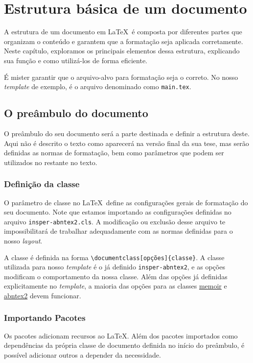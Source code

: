 \chapter{Estrutura básica de um documento}

A estrutura de um documento em \LaTeX\ é composta por diferentes partes que organizam o conteúdo e garantem que a formatação seja aplicada corretamente. Neste capítulo, exploramos os principais elementos dessa estrutura, explicando sua função e como utilizá-los de forma eficiente.

É mister garantir que o arquivo-alvo para formatação seja o correto. No nosso \textit{template} de exemplo, é o arquivo denominado como \texttt{main.tex}.

\section{O preâmbulo do documento}
O preâmbulo do seu documento será a parte destinada e definir a estrutura deste. Aqui não é descrito o texto como aparecerá na versão final da sua tese, mas serão definidas as normas de formatação, bem como parâmetros que podem ser utilizados no restante no texto.

\subsection{Definição da classe}
O parâmetro de classe no \LaTeX\ define as configurações gerais de formatação do seu documento. Note que estamos importando as configurações definidas no arquivo \texttt{insper-abntex2.cls}. A modificação ou exclusão desse arquivo te impossibilitará de trabalhar adequadamente com as normas definidas para o nosso \textit{layout}.

A classe é definida na forma \texttt{\textbackslash documentclass[opções]\{classe\}}. A classe utilizada para nosso \textit{template} é o já definido \texttt{insper-abntex2}, e as opções modificam o comportamento da nossa classe. Além das opções já definidas explicitamente no \textit{template}, a maioria das opções para as classes \href{https://linorg.usp.br/CTAN/macros/latex/contrib/memoir/memman.pdf}{memoir} e \href{https://br.mirrors.cicku.me/ctan/macros/latex/contrib/abntex2/doc/abntex2.pdf}{abntex2} devem funcionar.

\subsection{Importando Pacotes}
Os pacotes adicionam recursos ao \LaTeX. Além dos pacotes importados como dependências da própria classe de documento definida no início do preâmbulo, é possível adicionar outros a depender da necessidade.

